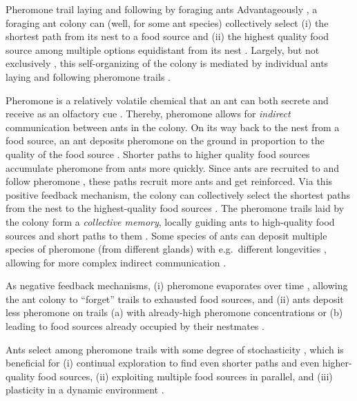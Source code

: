 \documentclass[fleqn,10pt,lineno]{wlpeerj}
\begin{document}
\begin{mybox}[label=box:ants, breakable]{Pheromone trail laying and following by foraging ants}
Advantageously \cite{deneubourg1983probabilistic}, a foraging ant colony can (well, for some ant species) collectively select 
(i) the shortest path from its nest to a food source \cite{goss1989self}
and
(ii) the highest quality food source among multiple options equidistant from its nest \cite{beckers1993modulation}. 
Largely, but not exclusively \cite{evison2008combined,czaczkes2015trail,robinson2005no}, this self-organizing of the colony is mediated by individual ants laying and following pheromone trails \cite{czaczkes2015trail}.

Pheromone is a relatively volatile chemical \cite{david2009trail} that an ant can both secrete and receive as an olfactory cue \cite{knaden2016sensory}. Thereby, pheromone allows for \emph{indirect} communication between ants in the colony. 
On its way back to the nest from a food source, an ant deposits pheromone on the ground in proportion to the quality of the food source \cite{beckers1993modulation}.
Shorter paths to higher quality food sources accumulate pheromone from ants more quickly.
Since ants are recruited to and follow pheromone \cite{beckers1993modulation,czaczkes2015trail}, these paths recruit more ants and get reinforced. Via this positive feedback mechanism, the colony can collectively select the shortest paths from the nest to the highest-quality food sources \cite{jackson2006communication,czaczkes2015trail,bonabeau1999swarm}.
The pheromone trails laid by the colony form a \emph{collective memory}, locally guiding ants to high-quality food sources and short paths to them \cite{jackson2006communication}.
Some species of ants can deposit multiple species of pheromone (from different glands) with e.g.\ different longevities \cite{czaczkes2015trail}, allowing for more complex indirect communication \cite{jackson2006communication,robinson2005no}.

As negative feedback mechanisms, 
(i) pheromone evaporates over time \cite{jackson2006communication,david2009trail,van2011temperature}, allowing the ant colony to ``forget'' trails to exhausted food sources,
and 
(ii) ants deposit less pheromone on trails (a) with already-high pheromone concentrations \cite{czaczkes2013ant} or (b) leading to food sources already occupied by their nestmates \cite{wendt2020negative}.

Ants select among pheromone trails with some degree of stochasticity \cite{deneubourg1990self}, which is beneficial for 
(i) continual exploration to find even shorter paths and even higher-quality food sources, 
(ii) exploiting multiple food sources in parallel, 
and 
(iii) plasticity in a dynamic environment \cite{deneubourg1983probabilistic,shiraishi2019diverse,deneubourg1986random,dussutour2009noise,edelstein1995trail}.



\end{mybox}
\end{document}
